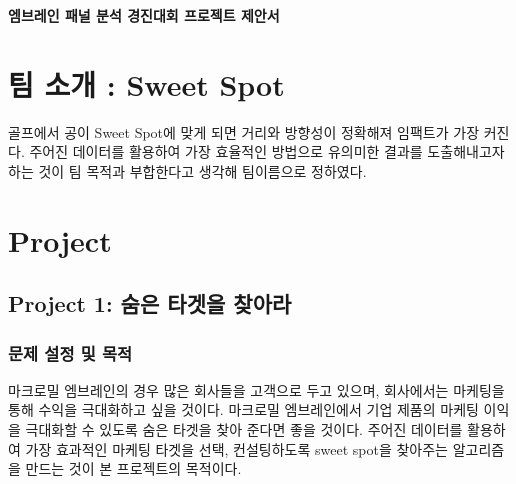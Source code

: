 \documentclass[11pt]{article}
\begin{document}
%

\newcommand{\Ito}{$It\hat{o}$'$s~Lemma$}

\newcommand\ind{\stackrel{\rm ind}{\sim}}
\newcommand\iid{\stackrel{\rm iid}{\sim}}
\renewcommand\c{\mathbf{c}}
\newcommand\y{\mathbf{y}}
\newcommand\z{\mathbf{z}}
\renewcommand\P{\mathbf{P}}
\newcommand\W{\mathbf{W}}
\newcommand\X{\mathbf{X}}
\newcommand\Y{\mathbf{Y}}
\newcommand\Z{\mathbf{Z}}
\newcommand\J{{\cal J}}
\newcommand\B{{\cal B}}
\newcommand\K{{\cal K}}
\newcommand\N{{\rm N}}
\newcommand\bs{\boldsymbol}
\newcommand\bth{\bs\theta}
\newcommand\bbe{\bs\beta}
\renewcommand\*{^\star}

\def\spacingset#1{\renewcommand{\baselinestretch}%
{#1}\small\normalsize} \spacingset{1}



  \bigskip
  \bigskip
  \bigskip
  \begin{center}
    {\LARGE\bf 엠브레인 패널 분석 경진대회 프로젝트 제안서 }
  \end{center}
  \medskip



\spacingset{1.45}

\section{팀 소개 : Sweet Spot}
골프에서 공이 Sweet Spot에 맞게 되면 거리와 방향성이 정확해져 임팩트가 가장 커진다. 주어진 데이터를 활용하여 가장 효율적인 방법으로 유의미한 결과를 도출해내고자 하는 것이 팀 목적과 부합한다고 생각해 팀이름으로 정하였다.

\section{Project}
\subsection{Project 1: 숨은 타겟을 찾아라}

\subsubsection{문제 설정 및 목적}
마크로밀 엠브레인의 경우 많은 회사들을 고객으로 두고 있으며, 회사에서는 마케팅을 통해 수익을 극대화하고 싶을 것이다. 마크로밀 엠브레인에서 기업 제품의 마케팅 이익을 극대화할 수 있도록 숨은 타겟을 찾아 준다면 좋을 것이다. 주어진 데이터를 활용하여 가장 효과적인 마케팅 타겟을 선택, 컨설팅하도록 sweet spot을 찾아주는 알고리즘을 만드는 것이 본 프로젝트의 목적이다.
\end{document}
